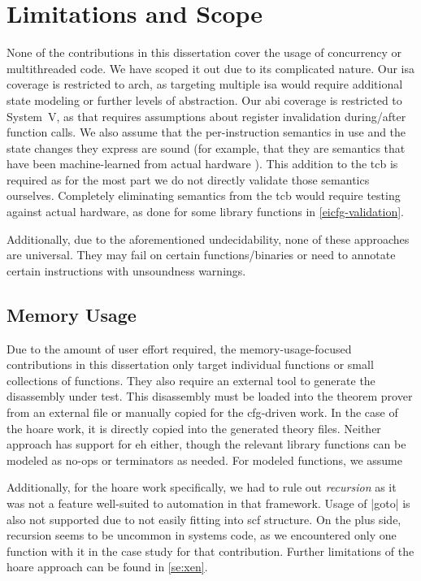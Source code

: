 \section{Limitations and Scope}
None of the contributions in this dissertation cover the usage of concurrency or multithreaded code.
We have scoped it out due to its complicated nature.
Our \gls{isa} coverage is restricted to \gls{arch}, as targeting multiple \gls{isa} would require additional state modeling or further levels of abstraction.
Our \gls{abi} coverage is restricted to System~V, as that requires assumptions about register invalidation during/after function calls.
We also assume that the per-instruction semantics in use and the state changes they express are sound (for example, that they are semantics that have been machine-learned from actual hardware \autocite{heule2016stratified,roessle2019verified}).
This addition to the \gls{tcb} is required as for the most part we do not directly validate those semantics ourselves.
Completely eliminating semantics from the \gls{tcb} would require testing against actual hardware, as done for some library functions in \cref{eicfg-validation}.

Additionally, due to the aforementioned undecidability, none of these approaches are universal.
They may fail on certain functions/binaries or need to annotate certain instructions with unsoundness warnings.

\subsection{Memory Usage}
Due to the amount of user effort required, the memory-usage-focused contributions in this dissertation only target individual functions or small collections of functions.
They also require an external tool to generate the disassembly under test.
This disassembly must be loaded into the theorem prover from an external file or manually copied for the \gls{cfg}-driven work.
In the case of the \gls{hoare} work, it is directly copied into the generated theory files.
Neither approach has support for \gls{eh} either, though the relevant library functions can be modeled as no-ops or terminators as needed.
For modeled functions, we assume

Additionally, for the \gls{hoare} work specifically, we had to rule out \emph{recursion} as it was not a feature well-suited to automation in that framework.
Usage of \inlineasm|goto| is also not supported due to not easily fitting into \gls{scf} structure.
On the plus side, recursion seems to be uncommon in systems code, as we encountered only one function with it in the case study for that contribution.
Further limitations of the \gls{hoare} approach can be found in \cref{se:xen}.

